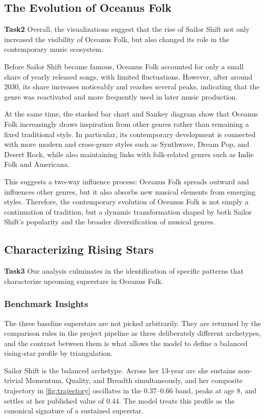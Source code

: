 \documentclass[journal]{vgtc}                     %
\begin{document}
\subsection{The Evolution of Oceanus Folk}
\textbf{Task2}
Overall, the visualizations suggest that the rise of Sailor Shift not only increased the visibility of Oceanus Folk, but also changed its role in the contemporary music ecosystem. 

Before Sailor Shift became famous, Oceanus Folk accounted for only a small share of yearly released songs, with limited fluctuations. However, after around 2030, its share increases noticeably and reaches several peaks, indicating that the genre was reactivated and more frequently used in later music production. 

At the same time, the stacked bar chart and Sankey diagram show that Oceanus Folk increasingly draws inspiration from other genres rather than remaining a fixed traditional style. In particular, its contemporary development is connected with more modern and cross-genre styles such as Synthwave, Dream Pop, and Desert Rock, while also maintaining links with folk-related genres such as Indie Folk and Americana. 

This suggests a two-way influence process: Oceanus Folk spreads outward and influences other genres, but it also absorbs new musical elements from emerging styles. Therefore, the contemporary evolution of Oceanus Folk is not simply a continuation of tradition, but a dynamic transformation shaped by both Sailor Shift's popularity and the broader diversification of musical genres.
\subsection{Characterizing Rising Stars}
\textbf{Task3}
Our analysis culminates in the identification of specific patterns that characterize upcoming superstars in Oceanus Folk.

\subsubsection{Benchmark Insights}
The three baseline superstars are not picked arbitrarily. They are returned by the comparison rules in the project pipeline as three deliberately different archetypes, and the contrast between them is what allows the model to define a balanced rising-star profile by triangulation.

Sailor Shift is the balanced archetype. Across her 13-year arc she sustains non-trivial Momentum, Quality, and Breadth simultaneously, and her composite trajectory in \cref{fig:trajectory} oscillates in the $0.37$--$0.66$ band, peaks at age $8$, and settles at her published value of $0.44$. The model treats this profile as the canonical signature of a sustained superstar.
\end{document}
